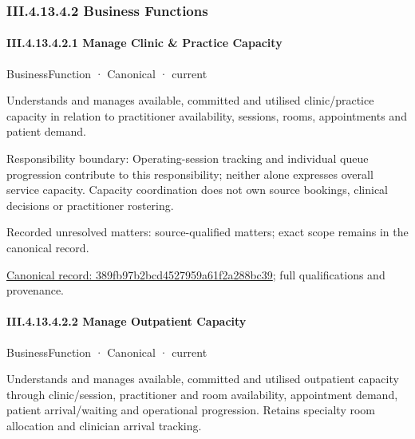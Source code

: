 \subsubsection*{III.4.13.4.2 Business Functions}
\label{navigation:III.4.13.4.2}

\paragraph*{III.4.13.4.2.1 Manage Clinic \& Practice Capacity}
\label{navigation:III.4.13.4.2.1}

\label{element:389fb97b2bcd4527959a61f2a288bc39}
{\small BusinessFunction · Canonical · current}\par

Understands and manages available, committed and utilised clinic/practice capacity in relation to practitioner availability, sessions, rooms, appointments and patient demand.



Responsibility boundary: Operating-session tracking and individual queue progression contribute to this responsibility; neither alone expresses overall service capacity. Capacity coordination does not own source bookings, clinical decisions or practitioner rostering.


{\small Recorded unresolved matters: source-qualified matters; exact scope remains in the canonical record.}\par
{\footnotesize \href{../../../../../../../../continuum/business/business-function/389fb97b2bcd4527959a61f2a288bc39.md}{Canonical record: 389fb97b2bcd4527959a61f2a288bc39}; full qualifications and provenance.}\par
\paragraph*{III.4.13.4.2.2 Manage Outpatient Capacity}
\label{navigation:III.4.13.4.2.2}

\label{element:45fd6190b7334f838575881725f6a66b}
{\small BusinessFunction · Canonical · current}\par

Understands and manages available, committed and utilised outpatient capacity through clinic/session, practitioner and room availability, appointment demand, patient arrival/waiting and operational progression. Retains specialty room allocation and clinician arrival tracking.



